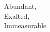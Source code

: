 \thispagestyle{empty}

\vspace*{100pt}
{\center\huge
Abundant,\\
Exalted,\\
Immeasurable\par
}
\clearpage

